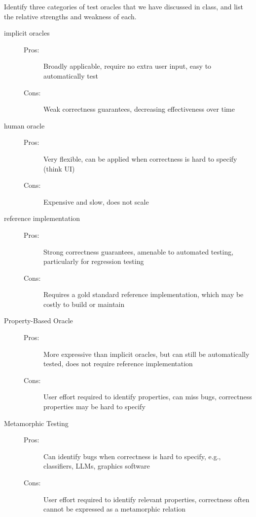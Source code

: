 \documentclass[addpoints, answers]{exam}
\begin{document}
\begin{questions}
\question[3] Identify three categories of test oracles that we have
  discussed in class, and list the relative strengths and weakness of
  each.
  \begin{solution} %
    \begin{description}
    \item[implicit oracles]
      \begin{description}
      \item[Pros:] Broadly applicable, require no extra user input,
        easy to automatically test
      \item[Cons:] Weak correctness guarantees, decreasing
        effectiveness over time
      \end{description}
    \item[human oracle]
      \begin{description}
      \item[Pros:] Very flexible, can be applied when correctness is
        hard to specify (think UI)
      \item[Cons:] Expensive and slow, does not scale
      \end{description}
    \item[reference implementation]
      \begin{description}
      \item[Pros:] Strong correctness guarantees, amenable to
        automated testing, particularly for regression testing
      \item[Cons:] Requires a gold standard reference implementation,
        which may be costly to build or maintain
      \end{description}
    \item[Property-Based Oracle]
      \begin{description}
      \item[Pros:] More expressive than implicit oracles, but can
        still be automatically tested, does not require reference implementation
      \item[Cons:] User effort required to identify properties, can
        miss bugs, correctness properties may be hard to specify
      \end{description}
    \item[Metamorphic Testing]
      \begin{description}
      \item[Pros:] Can identify bugs when correctness is hard to
        specify, e.g., classifiers, LLMs, graphics software
      \item[Cons:] User effort required to identify relevant
        properties, correctness often cannot be expressed as a
        metamorphic relation
      \end{description}
    \end{description}
  \end{solution}


\end{questions}
\end{document}

